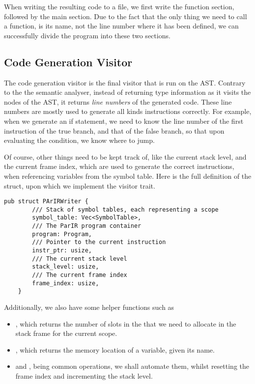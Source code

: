 When writing the resulting  code to a file, we first write the
function section, followed by the main section. Due to the fact that the only
thing we need to call a function, is its name, not the line number where it has
been defined, we can successfully divide the program into these two sections.

\newpage

\subsection{Code Generation Visitor}

The code generation visitor is the final visitor that is run on the AST.
Contrary to the the semantic analyser, instead of returning type information as
it visits the nodes of the AST, it returns \textit{line numbers} of the
generated  code. These line numbers are mostly used to generate all
kinds  instructions correctly. For example, when we generate an if
statement, we need to know the line number of the first instruction of the true
branch, and that of the false branch, so that upon evaluating the condition, we
know where to jump.

Of course, other things need to be kept track of, like the current stack level,
and the current frame index, which are used to generate the correct 
instructions, when referencing variables from the symbol table. Here is the full
definition of the  struct, upon which we implement the visitor
trait.

\begin{mainbox}{}
    \lstset{xleftmargin=.1\textwidth, aboveskip=0pt, belowskip=0pt}
    \begin{lstlisting}
pub struct PArIRWriter {
        /// Stack of symbol tables, each representing a scope
        symbol_table: Vec<SymbolTable>,
        /// The ParIR program container
        program: Program,
        /// Pointer to the current instruction
        instr_ptr: usize,
        /// The current stack level
        stack_level: usize,
        /// The current frame index
        frame_index: usize,
    }
\end{lstlisting}
\end{mainbox}

Additionally, we also have some helper functions such as

\begin{itemize}
    \item {}, which returns the number of slots in
          the that we need to allocate in the stack frame for the current scope.
    \item {}, which returns the memory
          location of a variable, given its name.  \item {} and
          , being common operations, we shall automate them, whilst
          resetting the frame index and incrementing the stack level.
\end{itemize}

